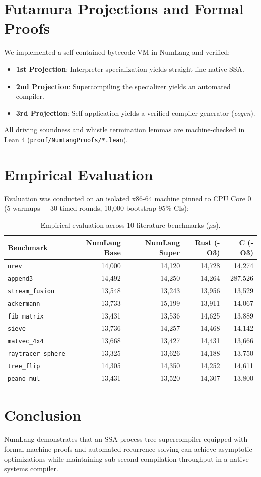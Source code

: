 \documentclass[10pt,twocolumn]{article}
\begin{document}
\section{Futamura Projections and Formal Proofs}
We implemented a self-contained bytecode VM in NumLang and verified:
\begin{itemize}
    \item \textbf{1st Projection}: Interpreter specialization yields straight-line native SSA.
    \item \textbf{2nd Projection}: Supercompiling the specializer yields an automated compiler.
    \item \textbf{3rd Projection}: Self-application yields a verified compiler generator (\textit{cogen}).
\end{itemize}
All driving soundness and whistle termination lemmas are machine-checked in Lean 4 (\texttt{proof/NumLangProofs/*.lean}).

\section{Empirical Evaluation}
Evaluation was conducted on an isolated x86-64 machine pinned to CPU Core 0 (5 warmups + 30 timed rounds, 10,000 bootstrap 95\% CIs):

\begin{table}[h]
\centering
\small
\caption{Empirical evaluation across 10 literature benchmarks ($\mu\text{s}$).}
\begin{tabular}{lrrrr}
\toprule
\textbf{Benchmark} & \textbf{NumLang Base} & \textbf{NumLang Super} & \textbf{Rust (-O3)} & \textbf{C (-O3)} \\
\midrule
\texttt{nrev}             & 14,000 & 14,120 & 14,728 & 14,274 \\
\texttt{append3}          & 14,492 & 14,250 & 14,264 & 287,526 \\
\texttt{stream\_fusion}   & 13,548 & 13,243 & 13,956 & 13,529 \\
\texttt{ackermann}        & 13,733 & 15,199 & 13,911 & 14,067 \\
\texttt{fib\_matrix}      & 13,431 & 13,536 & 14,625 & 13,889 \\
\texttt{sieve}            & 13,736 & 14,257 & 14,468 & 14,142 \\
\texttt{matvec\_4x4}      & 13,668 & 13,427 & 14,431 & 13,666 \\
\texttt{raytracer\_sphere}& 13,325 & 13,626 & 14,188 & 13,750 \\
\texttt{tree\_flip}       & 14,305 & 14,350 & 14,252 & 14,611 \\
\texttt{peano\_mul}       & 13,431 & 13,520 & 14,307 & 13,800 \\
\bottomrule
\end{tabular}
\end{table}

\section{Conclusion}
NumLang demonstrates that an SSA process-tree supercompiler equipped with formal machine proofs and automated recurrence solving can achieve asymptotic optimizations while maintaining sub-second compilation throughput in a native systems compiler.
\end{document}
